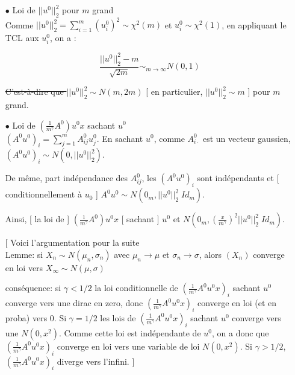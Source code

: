 \documentclass[a4paper, 11pt, french]{article}
\newcommand{\ch}[1]{{\color{blue} [ #1 ]}}
\begin{document}
	\begin{itemize}
		
		\item[$\bullet$] Loi de $ || u^0 ||_2^2$ pour $m$ grand \\
		
		Comme $ || u^0 ||_2^2 = \sum_{i=1}^{m} (u_i^0)^2 \sim \chi^2 (m)$ et $ u_i^0 \sim \chi^2 (1)$, en appliquant le TCL aux $ u_i^0 $, on a :
		
		\[
			\frac{|| u^0 ||_2^2 - m}{\sqrt{2m}} \sim_{m \to \infty}  N(0, 1)
		\]
	
		\sout{C'est-à-dire que $ || u^0 ||_2^2 \sim N(m, 2m) $} \ch{en particulier, $ || u^0 ||_2^2 \sim m $}  pour $m$ grand. \\
		
		\item[$\bullet$] Loi de $ \left(\frac{1}{m^{\gamma}} A^0 \right) u^0 x $ sachant $ u^0 $ \\
		
		$ (A^0 u^0)_i = \sum_{j=1}^m A_{ij}^0 u_j^0$. En sachant $u^0$, comme 
		$A_{i \cdot}^0$ est un vecteur gaussien, $(A^0 u^0)_i \sim  N(0, || u^0 ||_2^2 ) $. 
	
		De même, part indépendance des $A_{ij}^0$, les $(A^0 u^0)_i$ sont indépendants et \ch{conditionnellement \`a $u_{0}$} $A^0 u^0 \sim N(0_m, || u^0 ||_2^2 \; Id_m)$.
		
		Ainsi, \ch{la loi de } $ \left(\frac{1}{m^{\gamma}} A^0 \right) u^0 x $ \ch{sachant} $ u^0$ et 
		$N(0_m, \left( \frac{x}{m^{\gamma}} \right)^2 || u^0 ||_2^2 \; Id_m) $. \\
		
		\ch{Voici l'argumentation pour la suite\\
		Lemme: si $X_{n} \sim N(\mu_{n},\sigma_{n})$ avec $\mu_{n}\to\mu$ et $\sigma_{n}\to \sigma$, alors $(X_{n})$ converge en loi vers $X_{\infty} \sim N(\mu,\sigma)$
		
		cons\'equence: si $\gamma < 1/2$ la loi conditionnelle de $\left(\frac{1}{m^{\gamma}} A^0 u^0 x\right)_{i} $ sachant $u^0$ converge vers une dirac en zero, donc $\left(\frac{1}{m^{\gamma}} A^0 u^0 x\right)_{i} $ converge en loi (et en proba) vers 0.
		Si $\gamma=1/2$ les lois de $\left(\frac{1}{m^{\gamma}} A^0  u^0 x\right)_{i}$ sachant $u^0$ converge vers une $N(0,x^2)$. Comme cette loi est ind\'ependante de $u^0$, on a donc que $\left(\frac{1}{m^{\gamma}} A^0  u^0 x\right)_{i}$ converge en loi vers une variable de loi $N(0,x^2)$.
		Si $\gamma > 1/2$, $\left(\frac{1}{m^{\gamma}} A^0 u^0 x \right)_{i}$ diverge vers l'infini.}
		

\end{itemize}
\end{document}
